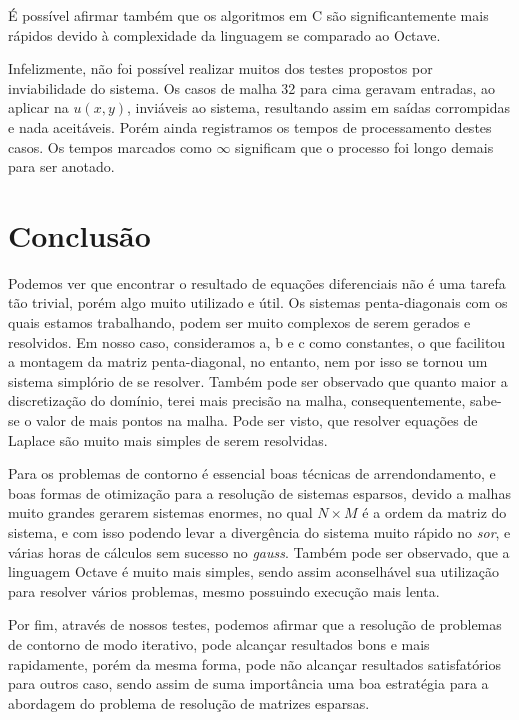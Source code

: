 \documentclass[
	11pt,				%
	oneside,			%
	a4paper,			%
	english,			%
	brazil,				%
	]{article}
\begin{document}
É possível afirmar também que os algoritmos em C são significantemente mais rápidos devido à complexidade da linguagem se comparado ao Octave.

Infelizmente, não foi possível realizar muitos dos testes propostos por inviabilidade do sistema. Os casos de malha 32 para cima geravam entradas, ao aplicar na $u(x,y)$, inviáveis ao sistema, resultando assim em saídas corrompidas e nada aceitáveis. Porém ainda registramos os tempos de processamento destes casos. Os tempos marcados como $\infty$ significam que o processo foi longo demais para ser anotado.

\section{Conclusão}
Podemos ver que encontrar o resultado de equações diferenciais não é uma tarefa tão trivial, porém algo muito utilizado e útil. Os sistemas penta-diagonais com os quais estamos trabalhando, podem ser muito complexos de serem gerados e resolvidos. Em nosso caso, consideramos a, b e c como constantes, o que facilitou a montagem da matriz penta-diagonal, no entanto, nem por isso se tornou um sistema simplório de se resolver. Também pode ser observado que quanto maior a discretização do domínio, terei mais precisão na malha, consequentemente, sabe-se o valor de mais pontos na malha. Pode ser visto, que resolver equações de Laplace são muito mais simples de serem resolvidas.

Para os problemas de contorno é essencial boas técnicas de arrendondamento, e boas formas de otimização para a resolução de sistemas esparsos, devido a malhas muito grandes gerarem sistemas enormes, no qual $N \times M$ é a ordem da matriz do sistema, e com isso podendo levar a divergência do sistema muito rápido no \textit{sor}, e várias horas de cálculos sem sucesso no \textit{gauss}. Também pode ser observado, que a linguagem Octave é muito mais simples, sendo assim aconselhável sua utilização para resolver vários problemas, mesmo possuindo execução mais lenta.

Por fim, através de nossos testes, podemos afirmar que a resolução de problemas de contorno de modo iterativo, pode alcançar resultados bons e mais rapidamente, porém da mesma forma, pode não alcançar resultados satisfatórios para outros caso, sendo assim de suma importância uma boa estratégia para a abordagem do problema de resolução de matrizes esparsas.

{}

\end{document}

